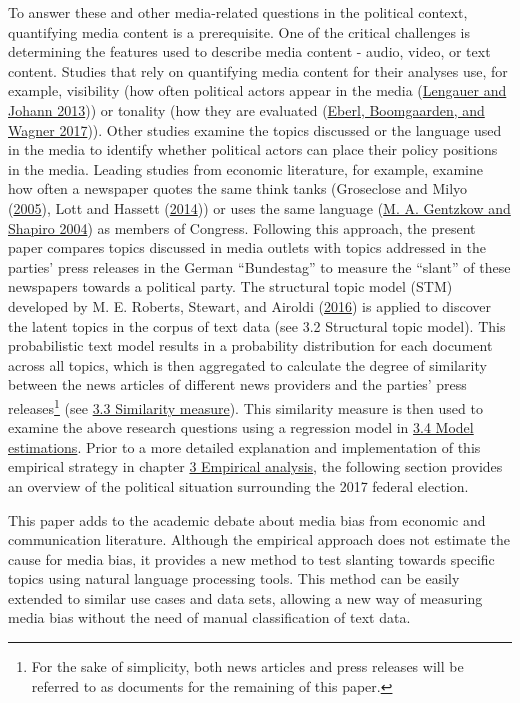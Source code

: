 \documentclass[
  12pt,
]{article}
\begin{document}
To answer these and other media-related questions in the political
context, quantifying media content is a prerequisite. One of the
critical challenges is determining the features used to describe media
content - audio, video, or text content. Studies that rely on
quantifying media content for their analyses use, for example,
visibility (how often political actors appear in the media
(\protect\hyperlink{ref-lengauer_candidate_2013}{Lengauer and Johann
2013})) or tonality (how they are evaluated
(\protect\hyperlink{ref-eberl_one_2017}{Eberl, Boomgaarden, and Wagner
2017})). Other studies examine the topics discussed or the language used
in the media to identify whether political actors can place their policy
positions in the media. Leading studies from economic literature, for
example, examine how often a newspaper quotes the same think tanks
(Groseclose and Milyo
(\protect\hyperlink{ref-groseclose_measure_2005}{2005}), Lott and
Hassett (\protect\hyperlink{ref-lott_is_2014}{2014})) or uses the same
language (\protect\hyperlink{ref-gentzkow_media_2004}{M. A. Gentzkow and
Shapiro 2004}) as members of Congress. Following this approach, the
present paper compares topics discussed in media outlets with topics
addressed in the parties' press releases in the German ``Bundestag'' to
measure the ``slant'' of these newspapers towards a political party. The
structural topic model (STM) developed by M. E. Roberts, Stewart, and
Airoldi (\protect\hyperlink{ref-roberts_model_2016}{2016}) is applied to
discover the latent topics in the corpus of text data (see
\protect\hypertarget{structural-topic-model}{}{3.2 Structural topic
model}). This probabilistic text model results in a probability
distribution for each document across all topics, which is then
aggregated to calculate the degree of similarity between the news
articles of different news providers and the parties' press
releases\footnote{For the sake of simplicity, both news articles and
  press releases will be referred to as documents for the remaining of
  this paper.} (see \protect\hyperlink{similarity-measure}{3.3
Similarity measure}). This similarity measure is then used to examine
the above research questions using a regression model in
\protect\hyperlink{model-estimations}{3.4 Model estimations}. Prior to a
more detailed explanation and implementation of this empirical strategy
in chapter \protect\hyperlink{empirical-analysis}{3 Empirical analysis},
the following section provides an overview of the political situation
surrounding the 2017 federal election.

This paper adds to the academic debate about media bias from economic
and communication literature. Although the empirical approach does not
estimate the cause for media bias, it provides a new method to test
slanting towards specific topics using natural language processing
tools. This method can be easily extended to similar use cases and data
sets, allowing a new way of measuring media bias without the need of
manual classification of text data.
\end{document}
